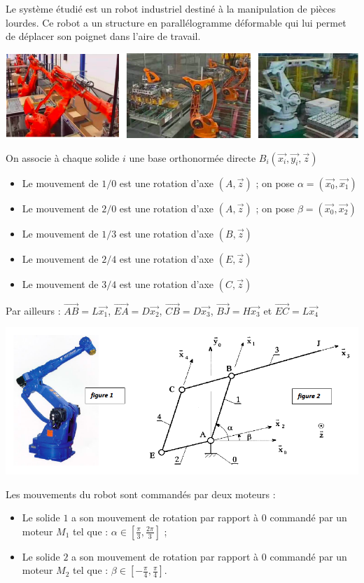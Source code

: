 Le système étudié est un robot industriel destiné à la manipulation de pièces lourdes. Ce robot a un structure en parallélogramme déformable qui lui permet de déplacer son poignet dans l'aire de travail.
\begin{center}
\includegraphics[scale=0.5]{png/robot_manipulateur.png}
\end{center}
On associe à chaque solide $i$ une base orthonormée directe $B_i(\overrightarrow{x_i},\overrightarrow{y_i},\overrightarrow{z})$
\begin{itemize}
\item Le mouvement de $1/0$ est une rotation d'axe $(A,\overrightarrow{z})$ ; on pose $\alpha=(\overrightarrow{x_0},\overrightarrow{x_1})$
\item Le mouvement de $2/0$ est une rotation d'axe $(A,\overrightarrow{z})$ ; on pose $\beta=(\overrightarrow{x_0},\overrightarrow{x_2})$
\item Le mouvement de $1/3$ est une rotation d'axe $(B,\overrightarrow{z})$
\item Le mouvement de $2/4$ est une rotation d'axe $(E,\overrightarrow{z})$
\item Le mouvement de $3/4$ est une rotation d'axe $(C,\overrightarrow{z})$
\end{itemize}
Par ailleurs : $\overrightarrow{AB}=L\overrightarrow{x_1}$, $\overrightarrow{EA}=D\overrightarrow{x_2}$, $\overrightarrow{CB}=D\overrightarrow{x_3}$, $\overrightarrow{BJ}=H\overrightarrow{x_3}$ et $\overrightarrow{EC}=L\overrightarrow{x_4}$

\begin{center}
\includegraphics[scale=0.5]{png/robot_manip_cine.png}
\end{center}
Les mouvements du robot sont commandés par deux moteurs :
\begin{itemize}
\item Le solide $1$ a son mouvement de rotation par rapport à $0$ commandé par un moteur $M_1$ tel que : $\alpha \in [\frac{\pi}{3},\frac{2\pi}{3}]$ ;
\item Le solide $2$ a son mouvement de rotation par rapport à $0$ commandé par un moteur $M_2$ tel que : $\beta \in [-\frac{\pi}{4},\frac{\pi}{4}]$.
\end{itemize}
